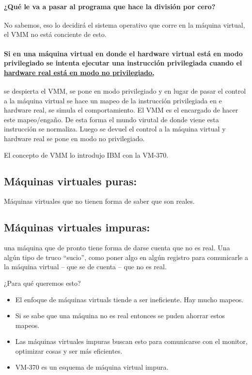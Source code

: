 \documentclass[12pt, times]{simauth}
\begin{document}
\paragraph{¿Qué le va a pasar al programa que hace la división por cero?} No sabemos, eso lo decidirá el sistema operativo que corre en la máquina virtual, el VMM no está conciente de esto.

\paragraph{Si en una máquina virtual en donde el hardware virtual está en modo privilegiado se intenta ejecutar una instrucción privilegiada cuando el \underline{hardware real está en modo no privilegiado,}}se despierta el VMM, se pone en modo privilegiado y en lugar de pasar el control a la máquina virtual se hace un mapeo de la instrucción privilegiada en e hardware real, se simula el comportamiento. El VMM es el encargado de hacer este mapeo/engaño. De esta forma el mundo virutal de donde viene esta instrucción se normaliza. Luego se devuel el control a la máquina virtual y hardware real se pone en modo no privilegiado.

El concepto de VMM lo introdujo IBM con la VM-370.

\subsection{Máquinas virtuales puras:} Máquinas virtuales que no tienen forma de saber que son reales.

\subsection{Máquinas virtuales impuras:} una máquina que de pronto tiene forma de darse cuenta que no es real. Una algún tipo de truco ``sucio'', como poner algo en algún registro para comunicarle a la máquina virtual -- que se de cuenta -- que no es real.

¿Para qué queremos esto? 
    \begin{itemize}
        \item El enfoque de máquinas virtuals tiende a ser ineficiente. Hay mucho mapeos.
        \item Si se sabe que una máquina no es real entonces se puden ahorrar estos mapeos.
        \item Las máquinas virtuales impuras buscan esto para comunicarse con el monitor, optimizar cosas y ser más eficientes.
        \item VM-370 es un esquema de máquina virtual impura.
    \end{itemize}
   
\end{document}
